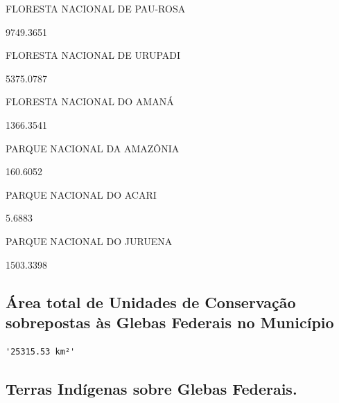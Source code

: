 \documentclass[
  letterpaper,
]{report}
\begin{document}
FLORESTA NACIONAL DE PAU-ROSA

\n      

9749.3651

\n    

\n    

\n      

FLORESTA NACIONAL DE URUPADI

\n      

5375.0787

\n    

\n    

\n      

FLORESTA NACIONAL DO AMANÁ

\n      

1366.3541

\n    

\n    

\n      

PARQUE NACIONAL DA AMAZÔNIA

\n      

160.6052

\n    

\n    

\n      

PARQUE NACIONAL DO ACARI

\n      

5.6883

\n    

\n    

\n      

PARQUE NACIONAL DO JURUENA

\n      

1503.3398

\n    

\n  

\n

\hypertarget{uxe1rea-total-de-unidades-de-conservauxe7uxe3o-sobrepostas-uxe0s-glebas-federais-no-municuxedpio}{%
\subsection{Área total de Unidades de Conservação sobrepostas às Glebas
Federais no
Município}\label{uxe1rea-total-de-unidades-de-conservauxe7uxe3o-sobrepostas-uxe0s-glebas-federais-no-municuxedpio}}

\begin{verbatim}
'25315.53 km²'
\end{verbatim}

\hypertarget{terras-induxedgenas-sobre-glebas-federais.}{%
\subsection{Terras Indígenas sobre Glebas
Federais.}\label{terras-induxedgenas-sobre-glebas-federais.}}
\end{document}
